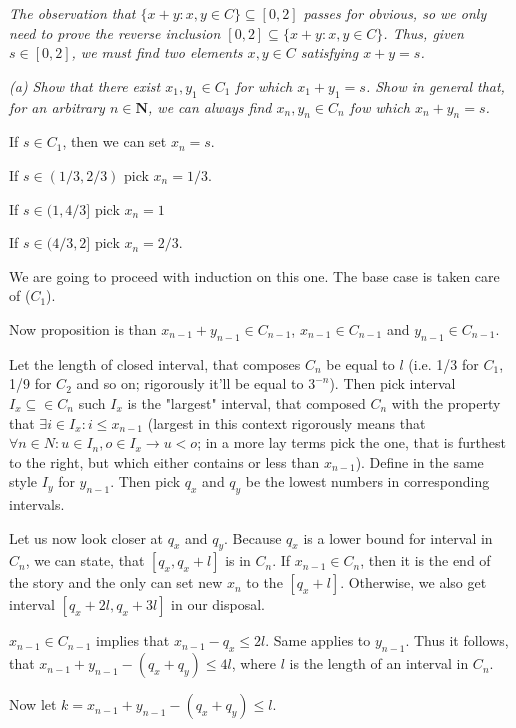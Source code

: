 \documentclass[11pt,oneside,titlepage]{article}
\begin{document}
\textit{The observation that $\{x + y: x,y \in C\} \subseteq [0,2]$ passes
  for obvious, so we only need to prove the reverse inclusion
  $[0, 2] \subseteq \{x + y: x,y \in C\}$. Thus, given $s \in [0,2]$, we
  must find two elements $x,y \in C$ satisfying $x + y = s$.}

\textit{(a) Show that there exist $x_1,y_1 \in C_1$ for which
  $x_1 + y_1 = s$. Show in general that, for an arbitrary $n \in \textbf{N}$,
  we  can always find $x_n,y_n \in C_n$ fow which $x_n + y_n = s$.
}

If $s \in C_1$, then we can set $x_n = s$.

If $s \in (1/3, 2/3)$ pick $x_n = 1/3$.

If $s \in (1, 4/3]$ pick $x_n = 1$

If $s \in (4/3,2]$ pick $x_n = 2/3$.

We are going to proceed with induction on this one. The base case is taken
care of ($C_1$).

Now proposition is than $x_{n - 1} + y_{n - 1} \in C_{n - 1}$,
$x_{n - 1} \in C_{n - 1}$ and $y_{n - 1} \in C_{n - 1}$.

Let the length of closed interval, that composes $C_n$ be equal to $l$
(i.e. 1/3 for $C_1$, 1/9 for $C_2$ and so on; rigorously it'll be equal
to $3^{-n}$). 
Then pick interval  $I_x \subseteq \in C_n$ 
such  $I_x$ is the "largest"
interval, that composed $C_n$ with the property that
$\exists i \in I_x: i \leq x_{n - 1}$ (largest
in this context rigorously means that
$\forall n \in N: u \in I_n, o \in I_x \to u < o$; in a more lay terms
pick the one, that is furthest to the right, but which either contains or
less than $x_{n - 1}$). Define in  the same style $I_y$ for $y_{n - 1}$.
Then pick $q_x$ and $q_y$ be the lowest numbers in corresponding intervals.

Let us now look closer at $q_x$ and $q_y$. Because $q_x$ is a lower bound
for interval in $C_n$,
we can state, that $[q_x,q_x + l]$ is in $C_n$. If $x_{n - 1} \in C_n$, then it
is the end of the story and the only can set new $x_n$ to the $[q_x + l]$.
Otherwise, we also get interval $[q_x + 2l, q_x + 3l]$ in our disposal.


$x_{n - 1} \in C_{n - 1}$  implies that $x_{n - 1} - q_x \leq 2l$.
Same applies to $y_{n - 1}$. 
Thus it follows, that $x_{n - 1} + y_{n - 1} - (q_x + q_y) \leq 4l$,
where $l$ is the length of an interval in $C_n$.

Now let $k = x_{n - 1} + y_{n - 1} - (q_x + q_y) \leq l$.
\end{document}
